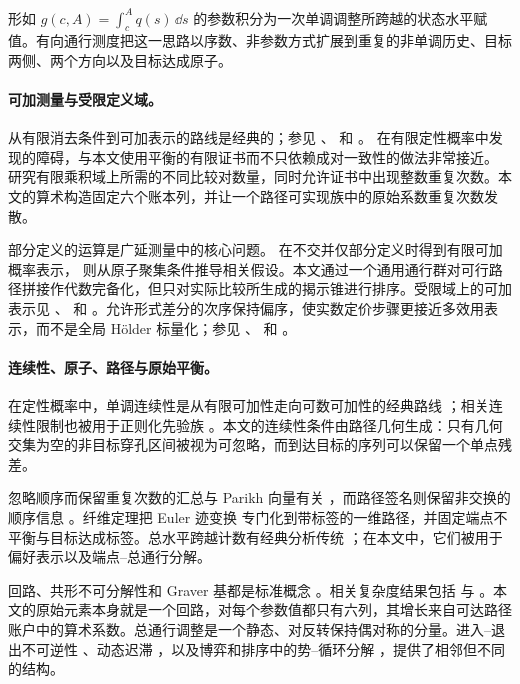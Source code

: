形如 $g(c,A)=\int_c^A q(s)\,\dd s$ 的参数积分为一次单调调整所跨越的状态水平赋值。有向通行测度把这一思路以序数、非参数方式扩展到重复的非单调历史、目标两侧、两个方向以及目标达成原子。

\paragraph{可加测量与受限定义域。}
从有限消去条件到可加表示的路线是经典的；参见 \citet{Scott1964}、\citet{KrantzEtAl1971} 和 \citet{Wakker1989}。\citet{KraftPrattSeidenberg1959} 在有限定性概率中发现的障碍，与本文使用平衡的有限证书而不只依赖成对一致性的做法非常接近。\citet{Fishburn2001} 研究有限乘积域上所需的不同比较对数量，同时允许证书中出现整数重复次数。本文的算术构造固定六个账本列，并让一个路径可实现族中的原始系数重复次数发散。

部分定义的运算是广延测量中的核心问题。\citet{Luce1967} 在不交并仅部分定义时得到有限可加概率表示，\citet{Mackenzie2021} 则从原子聚集条件推导相关假设。本文通过一个通用通行群对可行路径拼接作代数完备化，但只对实际比较所生成的揭示锥进行排序。受限域上的可加表示见 \citet{ChateauneufWakker1993}、\citet{Kopylov2007} 和 \citet{QinRommeswinkel2022}。允许形式差分的次序保持偏序，使实数定价步骤更接近多效用表示，而不是全局 H\"older 标量化；参见 \citet{Ok2002}、\citet{DubraMaccheroniOk2004} 和 \citet{EvrenOk2011}。

\paragraph{连续性、原子、路径与原始平衡。}
在定性概率中，单调连续性是从有限可加性走向可数可加性的经典路线 \citep{Villegas1964,ChateauneufJaffray1984,Chateauneuf1985}；相关连续性限制也被用于正则化先验族 \citep{ChateauneufMaccheroniMarinacciTallon2005}。本文的连续性条件由路径几何生成：只有几何交集为空的非目标穿孔区间被视为可忽略，而到达目标的序列可以保留一个单点残差。

忽略顺序而保留重复次数的汇总与 Parikh 向量有关 \citep{Parikh1966}，而路径签名则保留非交换的顺序信息 \citep{Chen1954,HamblyLyons2010}。纤维定理把 Euler 迹变换 \citep{Abrham1980,FleischnerEtAl1992} 专门化到带标签的一维路径，并固定端点不平衡与目标达成标签。总水平跨越计数有经典分析传统 \citep{Lochowski2017}；在本文中，它们被用于偏好表示以及端点--总通行分解。

回路、共形不可分解性和 Graver 基都是标准概念 \citep{Graver1975}。相关复杂度结果包括 \citet{BersteinOnn2009} 与 \citet{TatakisThoma2015}。本文的原始元素本身就是一个回路，对每个参数值都只有六列，其增长来自可达路径账户中的算术系数。总通行调整是一个静态、对反转保持偶对称的分量。进入--退出不可逆性 \citep{Dixit1989}、动态迟滞 \citep{MielkeRoubicek2015}，以及博弈和排序中的势--循环分解 \citep{CandoganEtAl2011,JiangEtAl2011}，提供了相邻但不同的结构。
